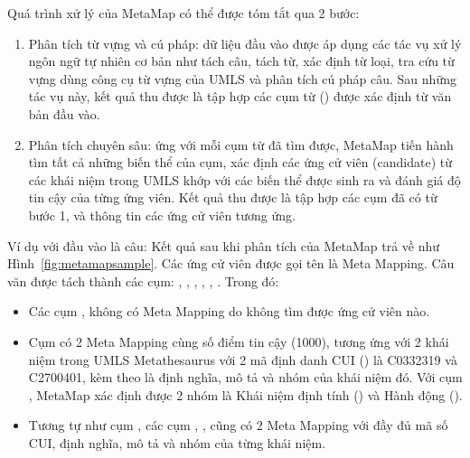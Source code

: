 Quá trình xử lý của MetaMap có thể được tóm tắt qua 2 bước:
\begin{enumerate}
\item Phân tích từ vựng và cú pháp: dữ liệu đầu vào được áp dụng các tác vụ xử lý ngôn ngữ tự nhiên cơ bản như tách câu, tách từ, xác định từ loại, tra cứu từ vựng dùng công cụ từ vựng của UMLS và phân tích cú pháp câu. Sau những tác vụ này, kết quả thu được là tập hợp các cụm từ () được xác định từ văn bản đầu vào.
\item Phân tích chuyên sâu: ứng với mỗi cụm từ đã tìm được, MetaMap tiến hành tìm tất cả những biến thể của cụm, xác định các ứng cử viên (candidate) từ các khái niệm trong UMLS khớp với các biến thể được sinh ra và đánh giá độ tin cậy của từng ứng viên. Kết quả thu được là tập hợp các cụm đã có từ bước 1, và thông tin các ứng cử viên tương ứng.
\end{enumerate}

Ví dụ với đầu vào là câu:  Kết quả sau khi phân tích của MetaMap trả về như Hình~\ref{fig:metamapsample}. Các ứng cử viên được gọi tên là Meta Mapping. Câu văn được tách thành các cụm: , , , , , . Trong đó:
\begin{itemize}
\item Các cụm ,  không có Meta Mapping do không tìm được ứng cử viên nào.
\item Cụm  có 2 Meta Mapping cùng số điểm tin cậy (1000), tương ứng với 2 khái niệm trong UMLS Metathesaurus với 2 mã định danh CUI () là C0332319 và C2700401, kèm theo là định nghĩa, mô tả và nhóm của khái niệm đó. Với cụm , MetaMap xác định được 2 nhóm là Khái niệm định tính () và Hành động ().
\item Tương tự như cụm , các cụm , ,  cũng có 2 Meta Mapping với đầy đủ mã số CUI, định nghĩa, mô tả và nhóm của từng khái niệm.
\end{itemize}

